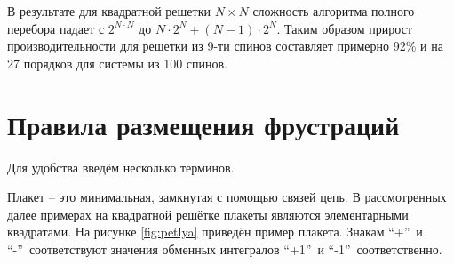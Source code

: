 \documentclass[utf8, babel, sor, jor, amsmath, amssymb, reprint]{elsarticle} %
\begin{document}
В результате для квадратной решетки $N \times N$ сложность алгоритма полного перебора падает с $2^{N \cdot N}$ до $N \cdot 2^N + (N - 1) \cdot 2^N$. Таким образом прирост производительности для решетки из 9-ти спинов составляет примерно 92\% и на 27 порядков для системы из 100 спинов.


\section{Правила размещения фрустраций}

Для удобства введём несколько терминов.

 Плакет – это минимальная, замкнутая с помощью связей цепь. В рассмотренных далее примерах на квадратной решётке плакеты являются элементарными квадратами. На рисунке \ref{fig:petlya} приведён пример плакета. Знакам \textquotedblleft +\textquotedblright ~и   \textquotedblleft -\textquotedblright ~соответствуют значения обменных интегралов  \textquotedblleft +1\textquotedblright ~и \textquotedblleft -1\textquotedblright ~соответственно.
\end{document}
